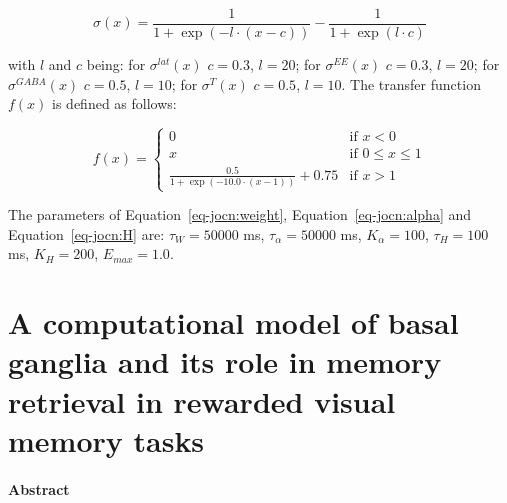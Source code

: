 \documentclass[
  11pt,
  a4paper,
]{scrbook}
\begin{document}
\[
    \sigma(x) = \frac{1}{1+\exp{(-l \cdot (x-c))}} - \frac{1}{1+\exp{(l \cdot c)}}
\]

with \(l\) and \(c\) being: for \(\sigma^{lat}(x)\) \(c = 0.3\),
\(l = 20\); for \(\sigma^{EE}(x)\) \(c = 0.3\), \(l = 20\); for
\(\sigma^{GABA}(x)\) \(c = 0.5\), \(l = 10\); for \(\sigma^{T}(x)\)
\(c = 0.5\), \(l = 10\). The transfer function \(f(x)\) is defined as
follows:

\[f(x)=
     \begin{cases}
        0 & \text{if $x < 0$}  \\
        x  & \text{if $0 \leq x \leq 1$} \\
    \frac{0.5}{1+\exp{(- 10.0 \cdot (x-1) )}} +0.75 & \text{if $x > 1$}
     \end{cases}
\]

The parameters of Equation~\ref{eq-jocn:weight},
Equation~\ref{eq-jocn:alpha} and Equation~\ref{eq-jocn:H} are:
\(\tau_W = 50000\) ms, \(\tau_\alpha = 50000\) ms, \(K_\alpha = 100\),
\(\tau_H = 100\) ms, \(K_H = 200\), \(E_{max} = 1.0\).


\chapter{A computational model of basal ganglia and its role in memory
retrieval in rewarded visual memory tasks}\label{sec-chapter:BG}


\subsubsection*{Abstract}\label{abstract-2}
\end{document}
